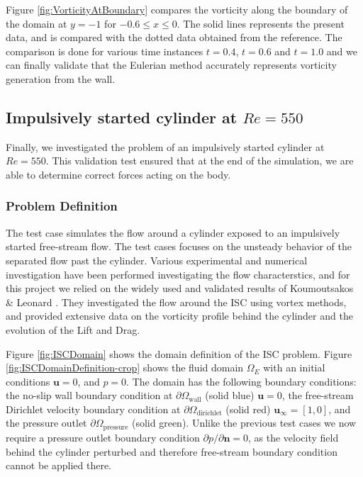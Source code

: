 Figure \ref{fig:VorticityAtBoundary} compares the vorticity along the boundary of the domain at $y=-1$ for $-0.6 \leqslant x \leqslant 0$. The solid lines represents the present data, and is compared with the dotted data obtained from the reference. The comparison is done for various time instances $t=0.4$, $t=0.6$ and $t=1.0$ and we can finally validate that the Eulerian method accurately represents vorticity generation from the wall.

\subsection{Impulsively started cylinder at $Re=550$}

Finally, we investigated the problem of an impulsively started cylinder at $Re=550$. This validation test ensured that at the end of the simulation, we are able to determine correct forces acting on the body. 

\subsubsection*{Problem Definition}
The  test case simulates the flow around a cylinder exposed to an impulsively started free-stream flow. The test cases focuses on the unsteady behavior of the separated flow past the cylinder. Various experimental and numerical investigation have been performed investigating the flow characterstics, and for this project we relied on the widely used and validated results of Koumoutsakos \& Leonard \cite{Koumoutsakos1995a}. They investigated the flow around the ISC using vortex methods, and provided extensive data on the vorticity profile behind the cylinder and the evolution of the Lift and Drag.

Figure \ref{fig:ISCDomain} shows the domain definition of the ISC problem. Figure \ref{fig:ISCDomainDefinition-crop} shows the fluid domain $\Omega_E$ with an initial conditions $\mathbf{u}=0$, and $p=0$. The domain has the following boundary conditions: the no-slip wall boundary condition at $\partial \Omega_{\mathrm{wall}}$ (solid blue) $\mathbf{u}=0$, the free-stream Dirichlet velocity boundary condition at $\partial \Omega_{\mathrm{dirichlet}}$ (solid red) $\mathbf{u}_{\infty} = [1,0]$, and the pressure outlet $\partial \Omega_{\mathrm{pressure}}$ (solid green). Unlike the previous test cases we now require a pressure outlet boundary condition $\partial p/ \partial \mathbf{n} = 0$, as the velocity field behind the cylinder perturbed and therefore free-stream boundary condition cannot be applied there.

